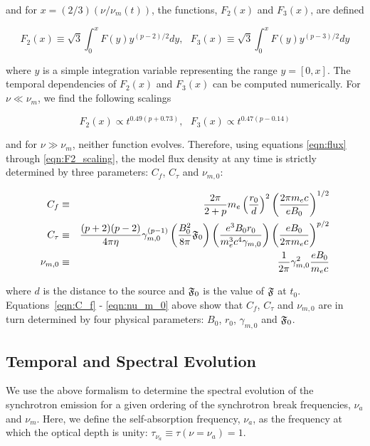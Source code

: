 \documentclass[12pt,preprint]{aastex}
\begin{document}
\noindent
and for $x=(2/3)(\nu/\nu_m(t))$, the functions, $F_2(x)$ and $F_3(x)$,
are defined

\begin{equation}
F_2(x)\equiv \sqrt{3}\int_0^{x} F(y) y^{(p-2)/2} dy,~~~F_3(x)\equiv \sqrt{3}\int_0^{x} F(y) y^{(p-3)/2} dy
\label{eqn:F_2}
\end{equation}

\noindent 
where $y$ is a simple integration variable representing the range
$y=[0,x]$.  The temporal dependencies of $F_2(x)$ and 
$F_3(x)$ can be computed numerically.  For $\nu \ll \nu_m$, we find the 
following scalings

\begin{equation}
F_2(x) \propto t^{0.49(p+0.73)},~~~F_3(x) \propto t^{0.47(p-0.14)}
\label{eqn:F2_scaling}
\end{equation}

\noindent
and for $\nu \gg \nu_m$, neither function evolves.
Therefore, using equations \ref{eqn:flux} through \ref{eqn:F2_scaling}, the
model flux density at any time is strictly determined by three
parameters: $C_f$, $C_{\tau}$ and $\nu_{m,0}$:

\begin{eqnarray}
C_f & \equiv &\frac{2\pi}{2+p} m_e \left(\frac{r_0}{d}\right)^2 \left(\frac{2\pi m_e c}{e B_0}\right)^{1/2}
\label{eqn:C_f} \\
C_{\tau} & \equiv & \frac{(p+2)(p-2)}{4\pi \eta} \gamma_{m,0}^{(p-1)} \left(\frac{B_0^2}{8\pi}  \frak{F}_0 \right) \left(\frac{e^3 B_0 r_0}{m_e^3 c^4 \gamma_{m,0}}\right) \left( \frac{e B_0}{2\pi m_e c}\right)^{p/2} 
\label{eqn:C_tau} \\
\nu_{m,0} & \equiv & \frac{1}{2\pi} \gamma_{m,0}^2 \frac{e B_0}{m_e c}
\label{eqn:nu_m_0}
\end{eqnarray}

\noindent
where $d$ is the distance to the source and $\frak{F}_0$ is the value
of $\frak{F}$ at $t_0$.  Equations~\ref{eqn:C_f} - \ref{eqn:nu_m_0}
above show that $C_f$, $C_{\tau}$ and $\nu_{m,0}$ are in turn
determined by four physical parameters: $B_0$, $r_0$, $\gamma_{m,0}$
and $\frak{F}_0$.

\subsection{Temporal and Spectral Evolution}
\label{sec:scalings}

We use the above formalism to determine the spectral evolution of the
synchrotron emission for a given ordering of the synchrotron break
frequencies, $\nu_a$ and $\nu_m$.  Here, we define the
self-absorption frequency, $\nu_a$, as the frequency at which the
optical depth is unity: $\tau_{\nu_a}\equiv \tau (\nu=\nu_a)=1$.  
\end{document}
